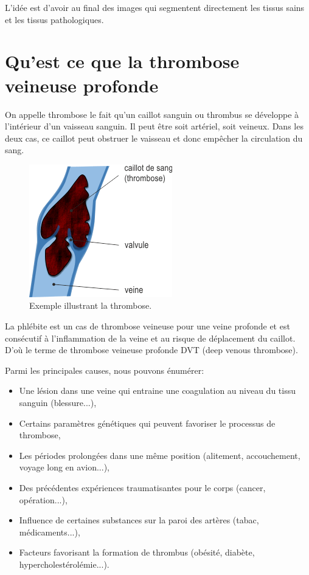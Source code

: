 L'idée est d'avoir au final des images qui segmentent directement les tissus sains et les tissus pathologiques.

\section{Qu'est ce que la thrombose veineuse profonde}

On appelle thrombose le fait qu'un caillot sanguin ou thrombus se développe à l'intérieur d'un vaisseau sanguin. Il peut être soit artériel, soit veineux. Dans les deux cas, ce caillot peut obstruer le vaisseau et donc empêcher la circulation du sang.

\begin{figure}[H]
\centering
    \includegraphics[scale=2,angle=0]{Images/phleb1.png}
    \caption{Exemple illustrant la thrombose.}
    \label{fig:phleb1}
\end{figure}

La phlébite est un cas de thrombose veineuse pour une veine profonde et est consécutif à l'inflammation de la veine et au risque de déplacement du caillot. D'où le terme de thrombose veineuse profonde DVT (deep venous thrombose).

Parmi les principales causes, nous pouvons énumérer:


\begin{itemize}
\item Une lésion dans une veine qui entraine une coagulation au niveau du tissu sanguin (blessure...),
\item Certains paramètres génétiques qui peuvent favoriser le processus de thrombose,
\item Les périodes prolongées dans une même position (alitement, accouchement, voyage long en avion...),
\item Des précédentes expériences traumatisantes pour le corps (cancer, opération...),
\item Influence de certaines substances sur la paroi des artères (tabac, médicaments...), 
\item Facteurs favorisant la formation de thrombus (obésité, diabète, hypercholestérolémie...). 
\end{itemize}

